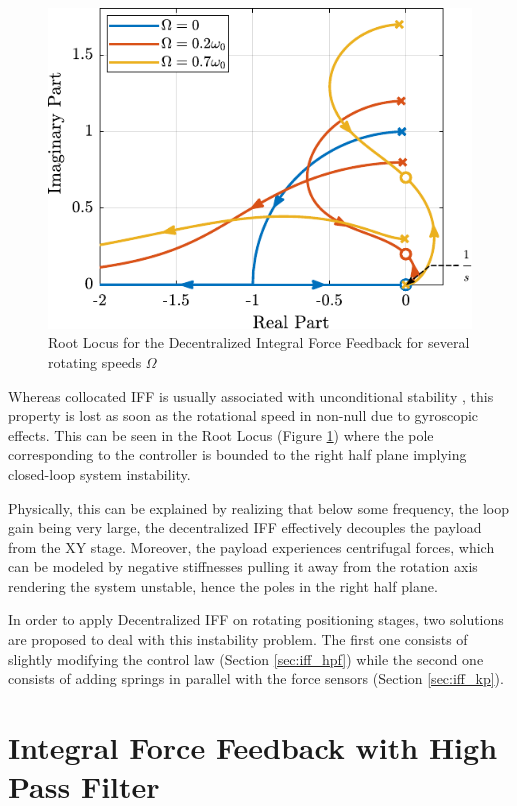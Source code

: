\documentclass{ISMA_USD2020}
\begin{document}
\begin{figure}[htbp]
\centering
\includegraphics[scale=1]{figs/root_locus_pure_iff.pdf}
\caption{\label{fig:root_locus_pure_iff}Root Locus for the Decentralized Integral Force Feedback for several rotating speeds \(\Omega\)}
\end{figure}

Whereas collocated IFF is usually associated with unconditional stability \cite{preumont91_activ}, this property is lost as soon as the rotational speed in non-null due to gyroscopic effects.
This can be seen in the Root Locus (Figure \ref{fig:root_locus_pure_iff}) where the pole corresponding to the controller is bounded to the right half plane implying closed-loop system instability.

Physically, this can be explained by realizing that below some frequency, the loop gain being very large, the decentralized IFF effectively decouples the payload from the XY stage.
Moreover, the payload experiences centrifugal forces, which can be modeled by negative stiffnesses pulling it away from the rotation axis rendering the system unstable, hence the poles in the right half plane.

In order to apply Decentralized IFF on rotating positioning stages, two solutions are proposed to deal with this instability problem.
The first one consists of slightly modifying the control law (Section \ref{sec:iff_hpf}) while the second one consists of adding springs in parallel with the force sensors (Section \ref{sec:iff_kp}).

\section{Integral Force Feedback with High Pass Filter}
\label{sec:orgcd3018b}
\label{sec:iff_hpf}
\end{document}
